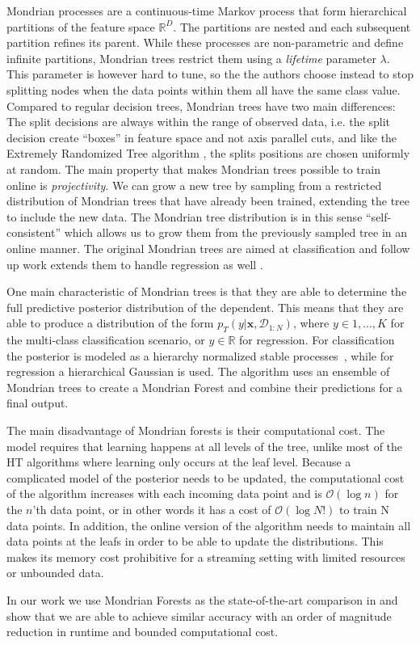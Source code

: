 Mondrian processes are a continuous-time
Markov process that form hierarchical partitions of the feature space $\mathbb{R}^D$.
The partitions are nested and each subsequent partition refines its parent. While
these processes are non-parametric and define infinite partitions, Mondrian trees
restrict them using a \emph{lifetime} parameter $\lambda$.
This parameter is however hard to tune,
so the the authors choose instead to stop splitting nodes when the data points
within them all have the same class value. Compared to regular decision trees,
Mondrian trees have two main differences: The split decisions are always within
the range of observed data, i.e. the split decision create ``boxes'' in feature
space and not axis parallel cuts, and like the Extremely Randomized Tree algorithm
\cite{ert}, the splits positions are chosen uniformly at random. The main property that makes Mondrian trees possible to train
online is \emph{projectivity}. We can grow a new tree by sampling from a restricted
distribution of Mondrian trees that have already been trained, extending the tree
to include the new data. The Mondrian tree distribution is in this sense ``self-consistent''
\cite{mondrian-forests-original} which allows us to grow them from the previously
sampled tree in an online manner. The original Mondrian trees are aimed at classification
and follow up work extends them to handle regression as well \cite{mondrian-forests-regression}.

One main characteristic of Mondrian trees is that they are able to determine the full
predictive posterior distribution of the dependent. This means that they are able to
produce a distribution of the form $p_T(y |\mathbf{x}, \mathcal{D}_{1:N})$, where
$y \in {1,..., K}$ for the multi-class classification scenario, or $y \in \mathbb{R}$
for regression. For classification the posterior is modeled as a hierarchy
normalized stable processes~\cite{nsp}, while for regression a hierarchical Gaussian is used.
The algorithm uses an ensemble of Mondrian trees to create a Mondrian Forest and combine
their predictions for a final output.

The main disadvantage of Mondrian forests is their computational cost. The model
requires that learning happens at all levels of the tree, unlike most of the HT
algorithms where learning only occurs at the leaf level. Because a complicated
model of the posterior needs to be updated, the computational cost of the algorithm
increases with each incoming data point and is $\mathcal{O}(\log n)$ for the $n$'th
data point, or in other words it has a cost of $\mathcal{O}(\log N!)$ to train N
data points. In addition, the online version of the algorithm needs to maintain
all data points at the leafs in order to be able to update the distributions.
This makes its memory cost prohibitive for a streaming setting with limited resources
or unbounded data.

In our work we use Mondrian Forests as the state-of-the-art comparison in \uncertaintrees
and show that we are able to achieve similar accuracy with an order of magnitude reduction
in runtime and bounded computational cost.